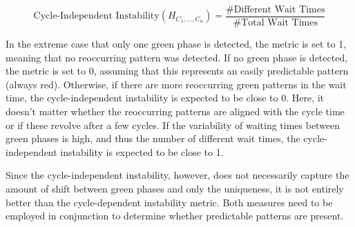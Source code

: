 \begin{equation}
\text{Cycle-Independent Instability}(H_{C_1, \dots, C_n}) = \frac{\text{\# Different Wait Times}}{\text{\# Total Wait Times}}
\end{equation}

In the extreme case that only one green phase is detected, the metric is set to 1, meaning that no reoccurring pattern was detected. If no green phase is detected, the metric is set to 0, assuming that this represents an easily predictable pattern (always red). Otherwise, if there are more reoccurring green patterns in the wait time, the cycle-independent instability is expected to be close to 0. Here, it doesn't matter whether the reoccurring patterns are aligned with the cycle time or if these revolve after a few cycles. If the variability of waiting times between green phases is high, and thus the number of different wait times, the cycle-independent instability is expected to be close to 1. 

Since the cycle-independent instability, however, does not necessarily capture the amount of shift between green phases and only the uniqueness, it is not entirely better than the cycle-dependent instability metric. Both measures need to be employed in conjunction to determine whether predictable patterns are present.

